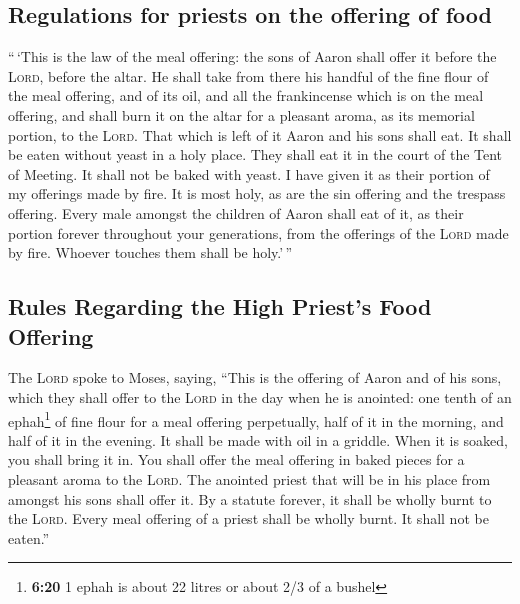 \hypertarget{regulations-for-priests-on-the-offering-of-food}{%
\subsection{Regulations for priests on the offering of
food}\label{regulations-for-priests-on-the-offering-of-food}}

 ``\,`This is the law of the meal offering: the sons of
Aaron shall offer it before the \textsc{Lord}, before the altar.
 He shall take from there his handful of the fine flour
of the meal offering, and of its oil, and all the frankincense which is
on the meal offering, and shall burn it on the altar for a pleasant
aroma, as its memorial portion, to the \textsc{Lord}. 
That which is left of it Aaron and his sons shall eat. It shall be eaten
without yeast in a holy place. They shall eat it in the court of the
Tent of Meeting.  It shall not be baked with yeast. I
have given it as their portion of my offerings made by fire. It is most
holy, as are the sin offering and the trespass offering. 
Every male amongst the children of Aaron shall eat of it, as their
portion forever throughout your generations, from the offerings of the
\textsc{Lord} made by fire. Whoever touches them shall be holy.'\,''

\hypertarget{rules-regarding-the-high-priests-food-offering}{%
\subsection{Rules Regarding the High Priest's Food
Offering}\label{rules-regarding-the-high-priests-food-offering}}

 The \textsc{Lord} spoke to Moses, saying,
 ``This is the offering of Aaron and of his sons, which
they shall offer to the \textsc{Lord} in the day when he is anointed:
one tenth of an ephah\footnote{\textbf{6:20} 1 ephah is about 22 litres
  or about 2/3 of a bushel} of fine flour for a meal offering
perpetually, half of it in the morning, and half of it in the evening.
 It shall be made with oil in a griddle. When it is
soaked, you shall bring it in. You shall offer the meal offering in
baked pieces for a pleasant aroma to the \textsc{Lord}. 
The anointed priest that will be in his place from amongst his sons
shall offer it. By a statute forever, it shall be wholly burnt to the
\textsc{Lord}.  Every meal offering of a priest shall be
wholly burnt. It shall not be eaten.''

